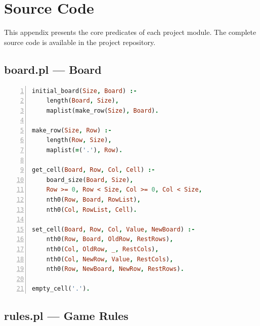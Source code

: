 
\chapter{Source Code}
\label{app:code}

This appendix presents the core predicates of each project module.
The complete source code is available in the project repository.

\section{board.pl --- Board}

\begin{lstlisting}[language=Prolog,
    caption={board.pl --- board creation and manipulation},
    label={lst:board_full},
    numbers=left,
    basicstyle=\footnotesize\ttfamily,
    frame=single]
initial_board(Size, Board) :-
    length(Board, Size),
    maplist(make_row(Size), Board).

make_row(Size, Row) :-
    length(Row, Size),
    maplist(=('.'), Row).

get_cell(Board, Row, Col, Cell) :-
    board_size(Board, Size),
    Row >= 0, Row < Size, Col >= 0, Col < Size,
    nth0(Row, Board, RowList),
    nth0(Col, RowList, Cell).

set_cell(Board, Row, Col, Value, NewBoard) :-
    nth0(Row, Board, OldRow, RestRows),
    nth0(Col, OldRow, _, RestCols),
    nth0(Col, NewRow, Value, RestCols),
    nth0(Row, NewBoard, NewRow, RestRows).

empty_cell('.').
\end{lstlisting}

\section{rules.pl --- Game Rules}

